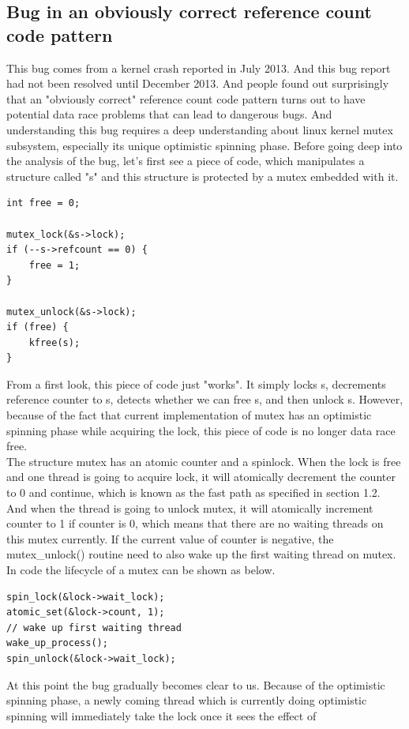 \documentclass[10pt,preprint]{sigplanconf}
\begin{document}
\subsection{Bug in an obviously correct reference count code pattern}
This bug comes from a kernel crash reported in July 2013. And this bug report had not been resolved until December 2013. And people found out surprisingly that an "obviously correct" reference count code pattern turns out to have potential data race problems that can lead to dangerous bugs. And understanding this bug requires a deep understanding about linux kernel mutex subsystem, especially its unique optimistic spinning phase. Before going deep into the analysis of the bug, let's first see a piece of code, which manipulates a structure called "s" and this structure is protected by a mutex embedded with it. 
\lstset{language=C}
\begin{lstlisting}
int free = 0;

mutex_lock(&s->lock);
if (--s->refcount == 0) {
	free = 1;
}

mutex_unlock(&s->lock);
if (free) {
	kfree(s);
}

\end{lstlisting}
From a first look, this piece of code just "works". It simply locks s, decrements reference counter to s, detects whether we can free s, and then unlock s. However, because of the fact that current implementation of mutex has an optimistic spinning phase while acquiring the lock, this piece of code is no longer data race free. \\
The structure mutex has an atomic counter and a spinlock. When the lock is free and one thread is going to acquire lock, it will atomically decrement the counter to 0 and continue, which is known as the fast path as specified in section 1.2.\\
And when the thread is going to unlock mutex, it will atomically increment counter to 1 if counter is 0, which means that there are no waiting threads on this mutex currently. If the current value of counter is negative, the mutex\_unlock() routine need to also wake up the first waiting thread on mutex. In code the lifecycle of a mutex can be shown as below.
\begin{lstlisting}
spin_lock(&lock->wait_lock);
atomic_set(&lock->count, 1);
// wake up first waiting thread
wake_up_process(); 
spin_unlock(&lock->wait_lock);
\end{lstlisting}
At this point the bug gradually becomes clear to us. Because of the optimistic spinning phase, a newly coming thread which is currently doing optimistic spinning will immediately take the lock once it sees the effect of 
\end{document}
